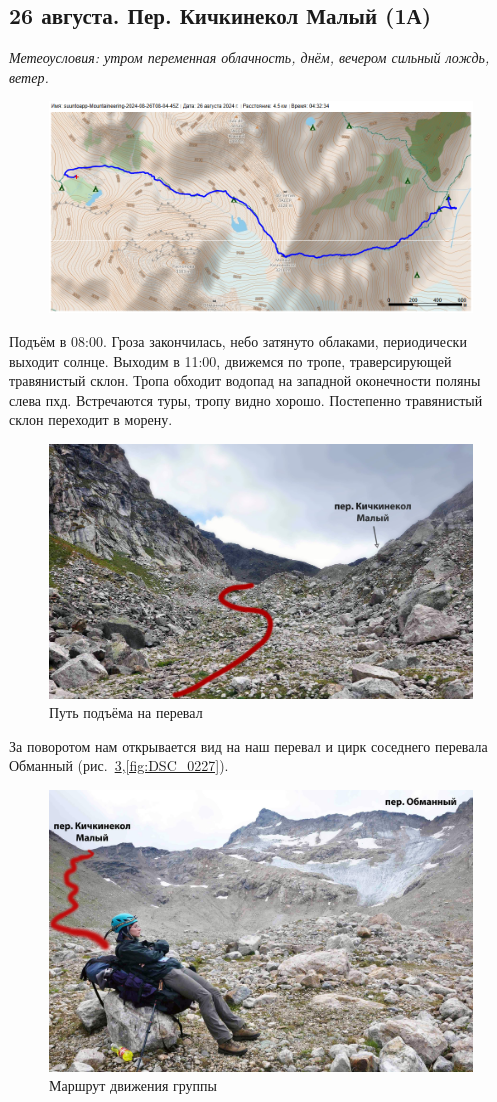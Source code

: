 \subsection{26 августа. Пер. Кичкинекол Малый (1А)}
\textit{Метеоусловия: утром переменная облачность, днём, вечером сильный лождь, ветер.}

\begin{figure}[h!]
	\centering
	\includegraphics[angle=0, width=0.7\linewidth]{../pics/mini_maps/26}
	\label{fig:mini_26}
\end{figure}

Подъём в 08:00. Гроза закончилась, небо затянуто облаками, периодически выходит солнце. Выходим в 11:00, движемся по тропе, траверсирующей травянистый склон.  Тропа обходит водопад на западной оконечности поляны слева пхд. Встречаются туры, тропу видно хорошо. 
Постепенно травянистый склон переходит в морену.

\begin{figure}[h!]
	\centering
	\includegraphics[width=0.7\linewidth]{../pics/DSC_0221.JPG}
	\caption{Путь подъёма на перевал}
	\label{fig:DSC_0221}
\end{figure}
 
 За поворотом нам открывается вид на наш перевал и цирк соседнего перевала Обманный (рис.~\ref{fig:DSC_0226},\ref{fig:DSC_0227}).
 
\begin{figure}[h!]
	\centering
	\includegraphics[width=0.7\linewidth]{../pics/DSC_0226}
	\caption{Маршрут движения группы}
	\label{fig:DSC_0226}
\end{figure}

